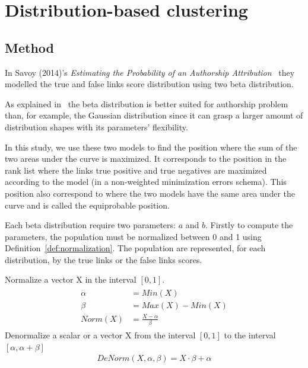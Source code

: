 \section{Distribution-based clustering\label{sec:distribution_based_clustering}}

\subsection{Method}

In Savoy (2014)'s \textit{Estimating the Probability of an Authorship Attribution}~\cite{savoy_probability} they modelled the true and false links score distribution using two beta distribution.

As explained in~\cite{savoy_probability} the beta distribution is better suited for authorship problem than, for example, the Gaussian distribution since it can grasp a larger amount of distribution shapes with its parameters' flexibility.

In this study, we use these two models to find the position where the sum of the two areas under the curve is maximized.
It corresponds to the position in the rank list where the links true positive and true negatives are maximized according to the model (in a non-weighted minimization errors schema).
This position also correspond to where the two models have the same area under the curve and is called the equiprobable position.

Each beta distribution require two parameters: $a$ and $b$.
Firstly to compute the parameters, the population must be normalized between 0 and 1 using Definition~\ref{def:normalization}.
The population are represented, for each distribution, by the true links or the false links scores.

\begin{definition}
  Normalize a vector X in the interval $[0, 1]$.
  \begin{gather*}
    \begin{aligned}
      \alpha &= Min(X) \\
      \beta &= Max(X) - Min(X) \\
      Norm(X) &= \frac{X - \alpha}{\beta}
    \end{aligned}
  \end{gather*}
  Denormalize a scalar or a vector X from the interval $[0, 1]$ to the interval $[\alpha, \alpha + \beta]$
  \begin{gather*}
    DeNorm(X, \alpha, \beta) = X \cdot \beta + \alpha
  \end{gather*}
\end{definition}

